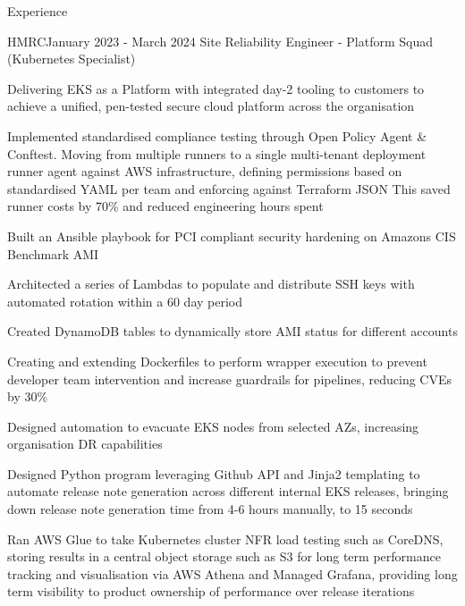 \documentclass{resume} %
\begin{document}
\begin{rSection}{Experience}
\begin{rSubsection}{HMRC}{January 2023 - March 2024}
{Site Reliability Engineer - Platform Squad (Kubernetes Specialist)}{}
\normalfont
\item Delivering EKS as a Platform with integrated day-2 tooling to customers to achieve a unified, pen-tested secure cloud platform across the organisation %
\item Implemented standardised compliance testing through Open Policy Agent \& Conftest. Moving from multiple runners to a single multi-tenant deployment runner agent against AWS infrastructure, defining permissions based on standardised YAML per team and enforcing against Terraform JSON This saved runner costs by 70\% and reduced engineering hours spent %
\item Built an Ansible playbook for PCI compliant security hardening on Amazons CIS Benchmark AMI %
\item Architected a series of Lambdas to populate and distribute SSH keys with automated rotation within a 60 day period %
\item Created DynamoDB tables to dynamically store AMI status for different accounts %
\item Creating and extending Dockerfiles to perform wrapper execution to prevent developer team intervention and increase guardrails for pipelines, reducing CVEs by 30\% %
\item Designed automation to evacuate EKS nodes from selected AZs, increasing organisation DR capabilities %
\item Designed Python program leveraging Github API and Jinja2 templating to automate release note generation across different internal EKS releases, bringing down release note generation time from 4-6 hours manually, to 15 seconds %
\item Ran AWS Glue to take Kubernetes cluster NFR load testing such as CoreDNS, storing results in a central object storage such as S3 for long term performance tracking and visualisation via AWS Athena and Managed Grafana, providing long term visibility to product ownership of performance over release iterations %
\end{rSubsection}


\end{rSection}
\end{document}
